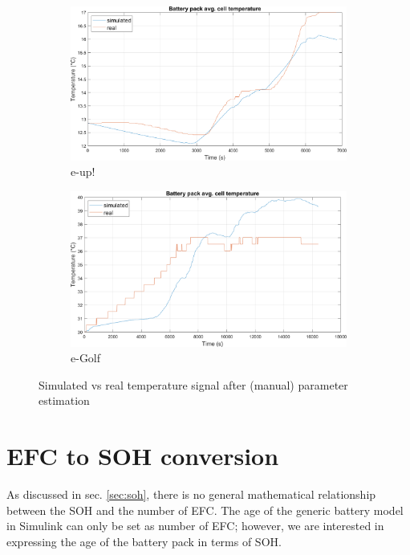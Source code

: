 \begin{figure}[htbp!]
\centering
\begin{subfigure}{\textwidth}
    \centering
    \includegraphics[width=\textwidth]{images/par_est_T_eup}
    \caption{e-up!}
\end{subfigure}

\vspace{20pt}

\begin{subfigure}{\textwidth}
    \centering
    \includegraphics[width=\textwidth]{images/par_est_T_egolf}
    \caption{e-Golf}
\end{subfigure}
\caption{Simulated vs real temperature signal after (manual) parameter estimation}
\label{fig:par_est_comparison_T}
\end{figure}





\section{EFC to SOH conversion}
\label{sec:efc2soh}
As discussed in sec. \ref{sec:soh}, there is no general mathematical relationship between the SOH and the number of EFC. The age of the generic battery model in Simulink can only be set as number of EFC; however, we are interested in expressing the age of the battery pack in terms of SOH.

